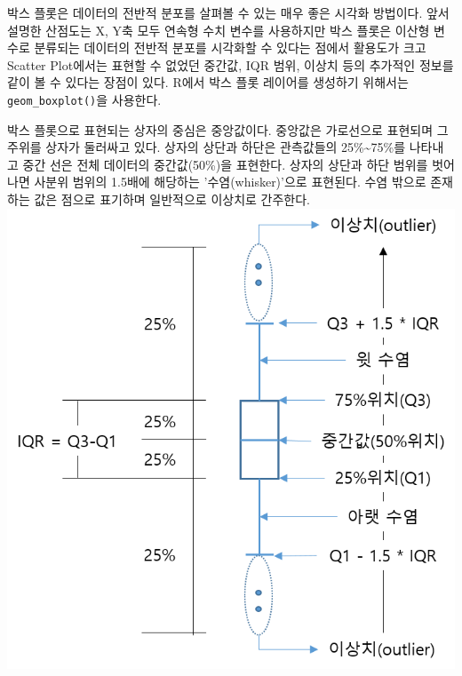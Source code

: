 \documentclass[
]{article}
\begin{document}
박스 플롯은 데이터의 전반적 분포를 살펴볼 수 있는 매우 좋은 시각화 방법이다. 앞서 설명한 산점도는 X, Y축 모두 연속형 수치 변수를 사용하지만 박스 플롯은 이산형 변수로 분류되는 데이터의 전반적 분포를 시각화할 수 있다는 점에서 활용도가 크고 Scatter Plot에서는 표현할 수 없었던 중간값, IQR 범위, 이상치 등의 추가적인 정보를 같이 볼 수 있다는 장점이 있다. R에서 박스 플롯 레이어를 생성하기 위해서는 \texttt{geom\_boxplot()}을 사용한다.

박스 플롯으로 표현되는 상자의 중심은 중앙값이다. 중앙값은 가로선으로 표현되며 그 주위를 상자가 둘러싸고 있다. 상자의 상단과 하단은 관측값들의 25\%\textasciitilde75\%를 나타내고 중간 선은 전체 데이터의 중간값(50\%)을 표현한다. 상자의 상단과 하단 범위를 벗어나면 사분위 범위의 1.5배에 해당하는 '수염(whisker)'으로 표현된다. 수염 밖으로 존재하는 값은 점으로 표기하며 일반적으로 이상치로 간주한다. \includegraphics{boxplot.png}
\end{document}
